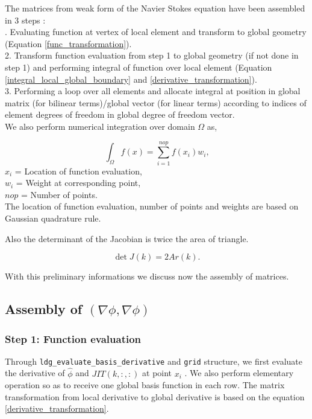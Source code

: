 \documentclass[a4paper,twoside,openright]{book}
\begin{document}
The matrices from weak form of the Navier Stokes equation have been assembled in 3 steps : \\
. Evaluating function at vertex of local element and transform to global geometry (Equation \eqref{func_transformation}).\\
2. Transform function evaluation from step 1 to global geometry (if not done in step 1) and performing integral of function over local element (Equation \eqref{integral_local_global_boundary} and \eqref{derivative_transformation}).\\
3. Performing a loop over all elements and allocate integral at position in global matrix (for bilinear terms)/global vector (for linear terms) according to indices of element degrees of freedom in global degree of freedom vector.\\

We also perform numerical integration over domain $\Omega$ as,

\begin{equation}\label{numerical integration}
\int_{\Omega} f(x) = \sum_{i=1}^{nop} f(x_i) w_i \textrm{,}
\end{equation}
\noindent
$x_i$ = Location of function evaluation,\\
$w_i$ = Weight at corresponding point,\\
$nop$ = Number of points.\\

The location of function evaluation, number of points and weights are based on Gaussian quadrature rule.

Also the determinant of the Jacobian is twice the area of triangle.

\begin{equation}\label{determinant to area}
\det J(k) = 2Ar(k) \textrm{.}
\end{equation}

With this preliminary informations we discuss now the assembly of matrices.

\subsection{Assembly of $(\nabla \phi, \nabla \phi)$}

\subsubsection{Step 1: Function evaluation}

Through \verb|ldg_evaluate_basis_derivative| and \verb|grid| structure, we first evaluate the derivative of $\hat{\phi}$ and $JIT(k,:,:)$ at point $x_i$ . We also perform elementary operation so as to receive one global basis function in each row. The matrix transformation from local derivative to global derivative is based on the equation \eqref{derivative_transformation}.
\end{document}
